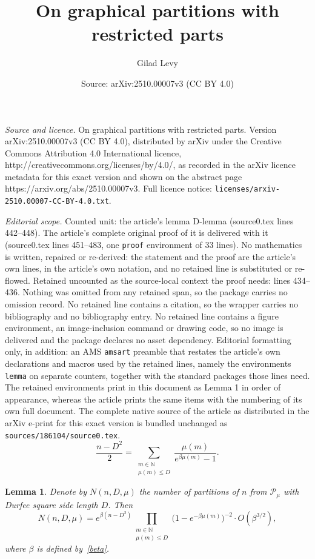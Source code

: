 \documentclass[10pt,a4paper]{amsart}
\title{On graphical partitions with restricted parts}
\author{Gilad Levy}
\date{Source: arXiv:2510.00007v3 (CC BY 4.0)}
\newtheorem{lemma}{Lemma}
\begin{document}
\maketitle

\noindent\emph{Source and licence.} On graphical partitions with restricted parts. Version arXiv:2510.00007v3 (CC BY 4.0), distributed by arXiv under the Creative Commons Attribution 4.0 International licence, http://creativecommons.org/licenses/by/4.0/, as recorded in the arXiv licence metadata for this exact version and shown on the abstract page https://arxiv.org/abs/2510.00007v3. Full licence notice: \texttt{licenses/arxiv-2510.00007-CC-BY-4.0.txt}.\par\smallskip

\noindent\textit{Editorial scope.} Counted unit: the article's lemma D-lemma (source0.tex lines 442--448). The article's complete original proof of it is delivered with it (source0.tex lines 451--483, one \texttt{proof} environment of 33 lines). No mathematics is written, repaired or re-derived: the statement and the proof are the article's own lines, in the article's own notation, and no retained line is substituted or re-flowed.  Retained uncounted as the source-local context the proof needs: lines 434--436.  Nothing was omitted from any retained span, so the package carries no omission record.  No retained line contains a citation, so the wrapper carries no bibliography and no bibliography entry.  No retained line contains a figure environment, an image-inclusion command or drawing code, so no image is delivered and the package declares no asset dependency.  Editorial formatting only, in addition: an AMS \texttt{amsart} preamble that restates the article's own declarations and macros used by the retained lines, namely the environments \texttt{lemma} on separate counters, together with the standard packages those lines need.  The retained environments print in this document as Lemma 1 in order of appearance, whereas the article prints the same items with the numbering of its own full document.  The complete native source of the article as distributed in the arXiv e-print for this exact version is bundled unchanged as \texttt{sources/186104/source0.tex}.
    \begin{equation}\label{beta}
        \frac{n-D^2}{2}=\sum_{\substack{m\in\mathbb{N} \\ \mu(m)\le D}}\frac{\mu(m)}{e^{\beta\mu(m)}-1}.
    \end{equation}

\begin{lemma}\label{D-lemma}
    Denote by $N(n,D,\mu)$ the number of partitions of $n$ from $\mathcal{P_{\mu}}$ with Durfee square side length $D$. Then
    \begin{equation}
        N(n,D,\mu)=e^{\beta(n-D^2)}\prod_{\substack{m\in\mathbb{N} \\ \mu(m)\le D}}\big(1-e^{-\beta\mu(m)}\big)^{-2} \cdot O(\beta^{3/2}),
    \end{equation}
    where $\beta$ is defined by~\eqref{beta}.
\end{lemma}
\end{document}
